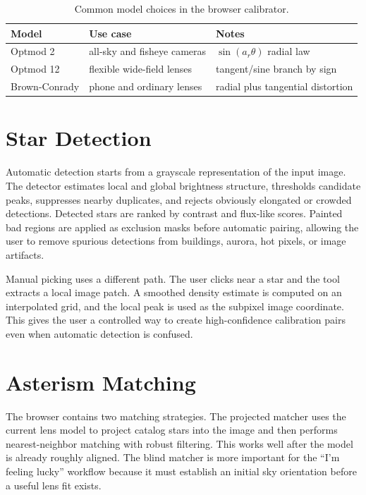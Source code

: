 \documentclass[11pt]{article}
\begin{document}
\begin{table}[h]
\centering
\begin{tabular}{lll}
\toprule
Model & Use case & Notes \\
\midrule
Optmod 2 & all-sky and fisheye cameras & \(\sin(a_r\theta)\) radial law \\
Optmod 12 & flexible wide-field lenses & tangent/sine branch by sign \\
Brown-Conrady & phone and ordinary lenses & radial plus tangential distortion \\
\bottomrule
\end{tabular}
\caption{Common model choices in the browser calibrator.}
\end{table}

\section{Star Detection}

Automatic detection starts from a grayscale representation of the input image.
The detector estimates local and global brightness structure, thresholds
candidate peaks, suppresses nearby duplicates, and rejects obviously elongated
or crowded detections. Detected stars are ranked by contrast and flux-like
scores. Painted bad regions are applied as exclusion masks before automatic
pairing, allowing the user to remove spurious detections from buildings,
aurora, hot pixels, or image artifacts.

Manual picking uses a different path. The user clicks near a star and the tool
extracts a local image patch. A smoothed density estimate is computed on an
interpolated grid, and the local peak is used as the subpixel image coordinate.
This gives the user a controlled way to create high-confidence calibration
pairs even when automatic detection is confused.

\section{Asterism Matching}

The browser contains two matching strategies. The projected matcher uses the
current lens model to project catalog stars into the image and then performs
nearest-neighbor matching with robust filtering. This works well after the
model is already roughly aligned. The blind matcher is more important for the
``I'm feeling lucky'' workflow because it must establish an initial sky
orientation before a useful lens fit exists.
\end{document}
